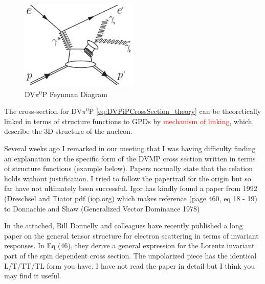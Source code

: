             
            \begin{figure}[H]
                \centering
                \includegraphics[width=0.5\textwidth]{Chapters/Ch1-Intro/Ch1-Sec2-GPDs-DVMP/pics/dvPiP_Feynman_diagram_2.jpg}
                \caption[DVPiP Feynman Diagram]{DV$\pi^0$P Feynman Diagram}
                \label{fig:DVPiP_diagram}
            \end{figure}

            The cross-section for DV$\pi^0$P \eqref{eq:DVPiPCrossSection_theory} can be theoretically linked in terms of structure functions to GPDs by \textcolor{red}{mechanism of linking}, which describe the 3D structure of the nucleon.
    
            
                  
        
            Several weeks ago I remarked in our meeting that I was having difficulty finding an explanation for the specific form of the DVMP cross section written in terms of structure functions (example below). Papers normally state that the relation holds without justification. I tried to follow the papertrail for the origin but so far have not ultimately been successful. Igor has kindly found a paper from 1992 (Dreschsel and Tiator pdf (iop.org) which makes reference (page 460, eq 18 - 19) \parencite{Dreschsel1992ThresholdNucleons}
            \parencite{Bedlinskiy2014ExclusiveCLAS} to Donnachie and Shaw (Generalized Vector Dominance 1978) \parencite{Donnachie1978GeneralizedDominance}
            
            
            In the attached, Bill Donnelly and colleagues have recently published a long paper
            on the general tensor structure for electron scattering in terms of invariant responses.
            In Eq (46), they derive a general expression for the Lorentz invariant part of the spin \parencite{Donnelly2023GeneralResponses}
            dependent cross section.  The unpolarized piece has the identical L/T/TT/TL form you have.
            I have not read the paper in detail but I think you may find it useful.
            

